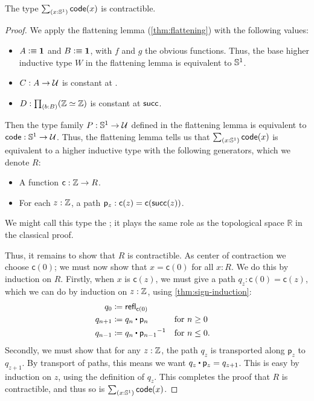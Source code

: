 \begin{lem}\label{thm:iscontr-s1cover}
  The type $\sm{x:\Sn^1}\code(x)$ is contractible.
\end{lem}
\begin{proof}
  We apply the flattening lemma (\cref{thm:flattening}) with the following values:
  \begin{itemize}
  \item $A\vcentcolon\equiv\mathbf{1}$ and $B\vcentcolon\equiv\mathbf{1}$, with $f$ and $g$ the obvious functions.
    Thus, the base higher inductive type $W$ in the flattening lemma is equivalent to $\mathbb{S}^1$.
  \item $C:A\to\mathcal{U}$ is constant at \Z.
  \item $D:\prd{b:B} (\eqv{\Z}{\Z})$ is constant at $\mathsf{succ}$.
  \end{itemize}
  Then the type family $P:\mathbb{S}^1\to\mathcal{U}$ defined in the flattening lemma is equivalent to $\mathsf{code}:\mathbb{S}^1\to\mathcal{U}$.
  Thus, the flattening lemma tells us that $\sm{x:\Sn^1}\code(x)$ is equivalent to a higher inductive type with the following generators, which we denote $R$:
  \begin{itemize}
  \item A function $\mathsf{c}: \mathbb{Z} \to R$.
  \item For each $z:\mathbb{Z}$, a path $\mathsf{p}_z:\mathsf{c}(z) = \mathsf{c}(\mathsf{succ}(z))$.
  \end{itemize}
  We might call this type the ;
  it plays the same role as the topological space $\mathbb{R}$ in the classical proof.

  Thus, it remains to show that $R$ is contractible.
  As center of contraction we choose $\mathsf{c}(0)$; we must now show that $x=\mathsf{c}(0)$ for all $x:R$.
  We do this by induction on $R$.
  Firstly, when $x$ is $\mathsf{c}(z)$, we must give a path $q_z:\mathsf{c}(0) = \mathsf{c}(z)$, which we can do by induction on $z:\mathbb{Z}$, using \cref{thm:sign-induction}:
  \begin{align*}
    q_0 &\defid \refl{\mathsf{c}(0)}\\
    q_{n+1} &\defid q_n \ct \mathsf{p}_n & &\text{for $n\ge 0$}\\
    q_{n-1} &\defid q_n \ct \opp{\mathsf{p}_{n-1}} & &\text{for $n\le 0$.}
  \end{align*}
  Secondly, we must show that for any $z:\mathbb{Z}$, the path $q_z$ is transported along $\mathsf{p}_z$ to $q_{z+1}$.
  By transport of paths, this means we want $q_z \ct \mathsf{p}_z = q_{z+1}$.
  This is easy by induction on $z$, using the definition of $q_z$.
  This completes the proof that $R$ is contractible, and thus so is $\sm{x:\Sn^1}\code(x)$.
\end{proof}


